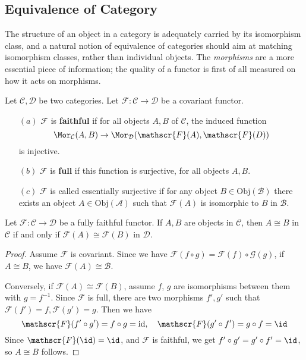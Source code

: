 \subsection{Equivalence of Category}
The structure of an object in a category is adequately carried by its isomorphism class, and a natural notion of equivalence of categories should aim at matching isomorphism classes, rather than individual objects. The \textit{morphisms} are a more essential piece of information; the quality of a functor is first of all measured on how it acts on morphisms.
\begin{definition}
Let $\mathcal{C},\mathcal{D}$ be two categories. Let $\mathscr{F}:\mathcal{C}\to\mathcal{D}$ be a covariant functor.
\begin{itemize}
\item[$(a)$] $\mathscr{F}$ is \textbf{faithful} if for all objects $A,B$ of $\mathcal{C}$, the induced function
\[\Mor_{\mathcal{C}}(A,B)\to\Mor_{\mathcal{D}}(\mathscr{F}(A),\mathscr{F}(D))\]
is injective.
\item[$(b)$] $\mathscr{F}$ is \textbf{full} if this function is surjective, for all objects $A,B$.
\item[$(c)$] $\mathscr{F}$ is called essentially surjective if for any object $B\in\mathrm{Obj}(\mathcal{B})$ there exists an object $A\in\mathrm{Obj}(\mathcal{A})$ such that $\mathscr{F}(A)$ is isomorphic to $B$ in $\mathcal{B}$.
\end{itemize}
\end{definition}
\begin{lemma}\label{fully faithful fuctor}
Let $\mathscr{F}:\mathcal{C}\to\mathcal{D}$ be a fully faithful functor. If $A,B$ are objects in $\mathcal{C}$, then $A\cong B$ in $\mathcal{C}$ if and only if $\mathscr{F}(A)\cong\mathscr{F}(B)$ in $\mathcal{D}$.
\end{lemma}
\begin{proof}
Assume $\mathscr{F}$ is covariant. Since we have $\mathscr{F}(f\circ g)=\mathscr{F}(f)\circ\mathscr{G}(g)$, if $A\cong B$, we have $\mathscr{F}(A)\cong\mathscr{B}$.\par
Conversely, if $\mathscr{F}(A)\cong\mathscr{F}(B)$, assume $f$, $g$ are isomorphisms between them with $g=f^{-1}$. Since $\mathscr{F}$ is full, there are two morphisms $f',g'$ such that $\mathscr{F}(f')=f,\mathscr{F}(g')=g$. Then we have
\[\mathscr{F}(f'\circ g')=f\circ g=\mathrm{id},\quad \mathscr{F}(g'\circ f')=g\circ f=\id\]
Since $\mathscr{F}(\id)=\id$, and $\mathscr{F}$ is faithful, we get $f'\circ g'=g'\circ f'=\id$, so $A\cong B$ follows.
\end{proof}
